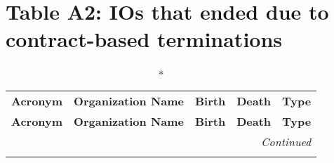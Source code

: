 \documentclass[12pt]{article}
\begin{document}
\newpage
\section*{Table A2: IOs that ended due to contract-based terminations}


\begin{longtable}{lp{5.5cm}ccc}
\caption*{} \\
\hline
\textbf{Acronym} & \textbf{Organization Name} & \textbf{Birth} & \textbf{Death} & \textbf{Type} \\
\hline
\endfirsthead

\hline
\textbf{Acronym} & \textbf{Organization Name} & \textbf{Birth} & \textbf{Death} & \textbf{Type} \\
\hline
\endhead

\hline
\multicolumn{5}{r}{\textit{Continued}} \\
\endfoot

\hline
\endlastfoot


\end{longtable}
\end{document}
